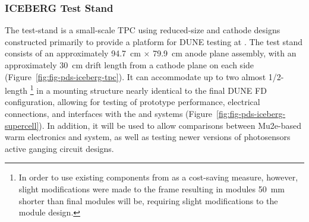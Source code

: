 




% 

\subsubsection{ICEBERG Test Stand}
\label{sec:iceberg-teststand}

The  test-stand is a small-scale TPC using reduced-size   and cathode designs constructed primarily to provide a platform for DUNE  testing at . 
The test stand consists of an approximately \SI{94.7}{cm} $\times$ \SI{79.9}{cm} anode plane assembly, with an approximately \SI{30}{cm} drift length from a cathode plane on each side (Figure~\ref{fig:fig-pds-iceberg-tpc}).  
It can accommodate up to two almost 1/2-length \footnote{In order to use existing  components from  as a cost-saving measure, however, slight modifications were made to the  frame resulting in  modules \SI{50}{mm} shorter than final modules will be, requiring slight modifications to the  module design.} in a mounting structure nearly identical to the final DUNE FD configuration, allowing for testing of  prototype performance, electrical connections, and interfaces with the  and  systems (Figure~\ref{fig:fig-pds-iceberg-supercell}). 
In addition, it will be used to allow comparisons between Mu2e-based warm electronics and   system, as well as testing newer versions of photosensors active ganging circuit designs.

